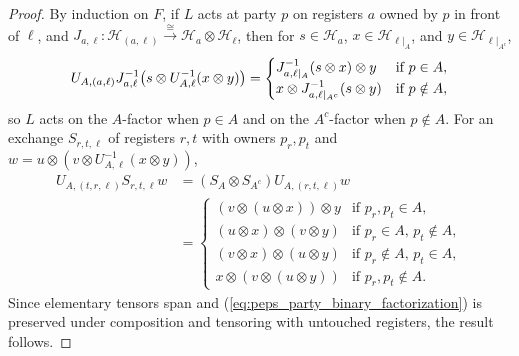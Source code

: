 \begin{proof}\leanok
    By induction on $F$, if $L$ acts at party $p$ on registers $a$ owned by $p$ in front of $\ell$, and $J_{a,\ell}:\mathcal H_{(a,\ell)}\xrightarrow{\cong}\mathcal H_a\otimes\mathcal H_\ell$, then for $s\in\mathcal H_a$, $x\in\mathcal H_{\ell|_A}$, and $y\in\mathcal H_{\ell|_{A^c}}$,
    \begin{align}
        U_{A,(a,\ell)}J_{a,\ell}^{-1}
        \bigl(s\otimes U_{A,\ell}^{-1}(x\otimes y)\bigr)
        =\begin{cases}
             J_{a,\ell|_A}^{-1}(s\otimes x)\otimes y
              & \text{if $p\in A$},    \\
             x\otimes J_{a,\ell|_{A^c}}^{-1}(s\otimes y)
              & \text{if $p\notin A$},
         \end{cases}
        \notag
    \end{align}
    so $L$ acts on the $A$-factor when $p\in A$ and on the $A^c$-factor when $p\notin A$. For an exchange $S_{r,t,\ell}$ of registers $r,t$ with owners $p_r,p_t$ and $w=u\otimes(v\otimes U_{A,\ell}^{-1}(x\otimes y))$,
    \begin{align}
        U_{A,(t,r,\ell)}S_{r,t,\ell}w
         & =(S_A\otimes S_{A^c})U_{A,(r,t,\ell)}w   \\
         & =\begin{cases}
                (v\otimes(u\otimes x))\otimes y
                 & \text{if $p_r,p_t\in A$},            \\
                (u\otimes x)\otimes(v\otimes y)
                 & \text{if $p_r\in A$, $p_t\notin A$}, \\
                (v\otimes x)\otimes(u\otimes y)
                 & \text{if $p_r\notin A$, $p_t\in A$}, \\
                x\otimes(v\otimes(u\otimes y))
                 & \text{if $p_r,p_t\notin A$}.
            \end{cases}
        \label{eq:peps_party_exchange}
    \end{align}
    Since elementary tensors span and (\ref{eq:peps_party_binary_factorization}) is preserved under composition and tensoring with untouched registers, the result follows.
\end{proof}

